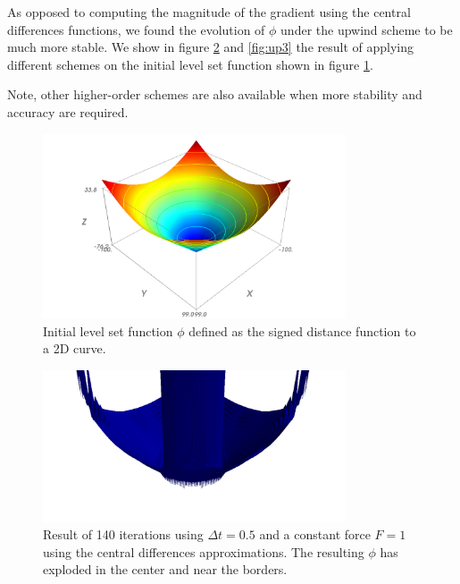 \documentclass{article}
\begin{document}
As opposed to computing the magnitude of the gradient using the central
differences functions, we found the evolution of $\phi$ under the upwind
scheme to be much more stable. We show in figure \ref{fig:up2} and
\ref{fig:up3} the result of applying different schemes on the initial level set
function shown in figure \ref{fig:up1}.

Note, other higher-order schemes are also available when more stability and
accuracy are required.

\begin{figure}
  \centering
  \includegraphics[width=0.8\textwidth]{img/up01.png}
  \caption{Initial level set function $\phi$ defined as the signed distance
    function to a 2D curve.}
  \label{fig:up1}
\end{figure}

\begin{figure}
  \centering
  \includegraphics[width=0.8\textwidth]{img/up03.png}
  \caption{Result of 140 iterations using $\Delta t = 0.5$ and a constant
    force $F=1$ using the central differences approximations. The resulting
    $\phi$ has exploded in the center and near the borders.}
  \label{fig:up2}
\end{figure}
\end{document}
